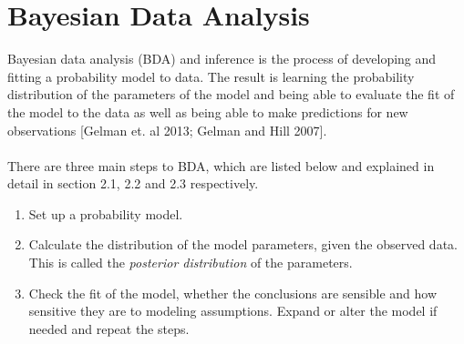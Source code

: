 \documentclass[12pt, oneside]{article}
\begin{document}
\section{Bayesian Data Analysis}
Bayesian data analysis (BDA) and inference is the process of developing and fitting a probability model to data. The result is learning the probability distribution of the parameters of the model and being able to evaluate the fit of the model to the data as well as being able to make predictions for new observations [Gelman et. al 2013; Gelman and Hill 2007].
\\
\\
There are three main steps to BDA, which are listed below and explained in detail in section 2.1, 2.2 and 2.3 respectively.
\begin{enumerate}
\item{Set up a probability model.}
\item{Calculate the distribution of the model parameters, given the observed data. This is called the \textit{posterior distribution} of the parameters.}
\item{Check the fit of the model, whether the conclusions are sensible and how sensitive they are to modeling assumptions. Expand or alter the model if needed and repeat the steps.}
\end{enumerate}
\end{document}
